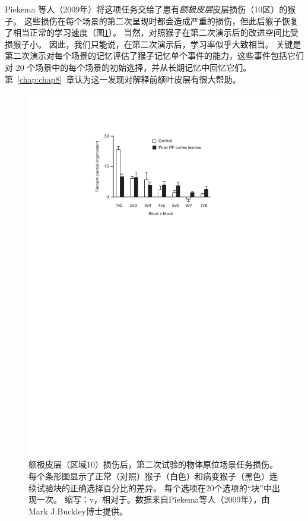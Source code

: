 Piekema 等人（2009年）将这项任务交给了患有\textit{额极皮层}皮层损伤（10区）的猴子。
这些损伤在每个场景的第二次呈现时都会造成严重的损伤，但此后猴子恢复了相当正常的学习速度（图\ref{fig:3_10}）。
当然，对照猴子在第二次演示后的改进空间比受损猴子小。
因此，我们只能说，在第二次演示后，学习率似乎大致相当。
关键是第二次演示对每个场景的记忆评估了猴子记忆单个事件的能力，这些事件包括它们对 20 个场景中的每个场景的初始选择，并从长期记忆中回忆它们。
第~\ref{chap:chap8}~章认为这一发现对解释前额叶皮层有很大帮助。\par


\begin{figure}[!htb]
	\centering
	\includegraphics{chap3/3_10}
	\caption{额极皮层（区域10）损伤后，第二次试验的物体原位场景任务损伤。每个条形图显示了正常（对照）猴子（白色）和病变猴子（黑色）连续试验块的正确选择百分比的差异。
		每个选项在20个选项的“块”中出现一次。
		缩写：v，相对于。数据来自Piekema等人（2009年），由Mark J.Buckley博士提供。}
	\label{fig:3_10}
\end{figure}



